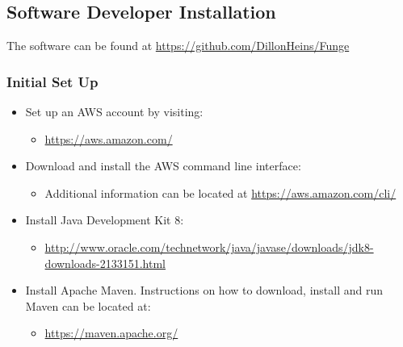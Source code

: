 \documentclass{article}
\begin{document}
\cleardoublepage

	\subsection{Software Developer Installation}
		The software can be found at \url{https://github.com/DillonHeins/Funge}
		\subsubsection{Initial Set Up}
			\begin{itemize}
				\item Set up an AWS account by visiting:
					\begin{itemize}
						\item \url{https://aws.amazon.com/}
					\end{itemize}
				\item Download and install the AWS command line interface:
					\begin{itemize}
						\item Additional information can be located at \url{https://aws.amazon.com/cli/}
					\end{itemize}
				\item Install Java Development Kit 8:
					\begin{itemize}
						\item \url{http://www.oracle.com/technetwork/java/javase/downloads/jdk8-downloads-2133151.html}
					\end{itemize}
				\item Install Apache Maven. Instructions on how to download, install and run Maven can be located at:
					\begin{itemize}
						\item \url{https://maven.apache.org/}
					\end{itemize}
			\end{itemize}
\end{document}
